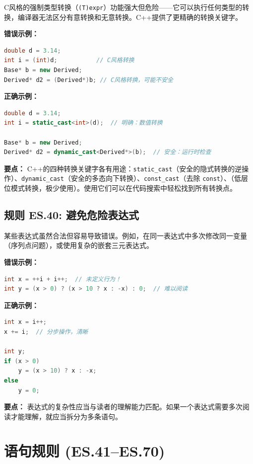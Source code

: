 C风格的强制类型转换（\texttt{(T)expr}）功能强大但危险——它可以执行任何类型的转换，编译器无法区分有意转换和无意转换。C++提供了更精确的转换关键字。

\textbf{错误示例：}

\begin{lstlisting}[language=C++]
double d = 3.14;
int i = (int)d;           // C风格转换
Base* b = new Derived;
Derived* d2 = (Derived*)b; // C风格转换，可能不安全
\end{lstlisting}

\textbf{正确示例：}

\begin{lstlisting}[language=C++]
double d = 3.14;
int i = static_cast<int>(d);  // 明确：数值转换

Base* b = new Derived;
Derived* d2 = dynamic_cast<Derived*>(b);  // 安全：运行时检查
\end{lstlisting}

\textbf{要点：} C++的四种转换关键字各有用途：\texttt{static\_cast}（安全的隐式转换的逆操作）、\texttt{dynamic\_cast}（安全的多态向下转换）、\texttt{const\_cast}（去除 \texttt{const}）、\texttt{}（低层位模式转换，极少使用）。使用它们可以在代码搜索中轻松找到所有转换点。

\subsection*{\textbf{规则 ES.40:} 避免危险表达式}

某些表达式虽然合法但容易导致错误。例如，在同一表达式中多次修改同一变量（序列点问题），或使用复杂的嵌套三元表达式。

\textbf{错误示例：}

\begin{lstlisting}[language=C++]
int x = ++i + i++;  // 未定义行为！
int y = (x > 0) ? (x > 10 ? x : -x) : 0;  // 难以阅读
\end{lstlisting}

\textbf{正确示例：}

\begin{lstlisting}[language=C++]
int x = i++;
x += i;  // 分步操作，清晰

int y;
if (x > 0)
    y = (x > 10) ? x : -x;
else
    y = 0;
\end{lstlisting}

\textbf{要点：} 表达式的复杂性应当与读者的理解能力匹配。如果一个表达式需要多次阅读才能理解，就应当拆分为多条语句。

\section{语句规则 (ES.41--ES.70)}

